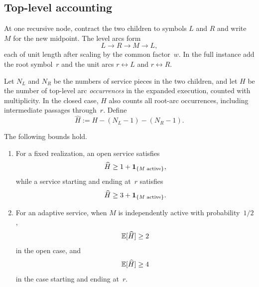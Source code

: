 \documentclass[12pt,a4paper,oneside]{report}
\begin{document}
\subsection{Top-level accounting}\label{sec:recursive-accounting}

At one recursive node, contract the two children to symbols $L$ and $R$ and
write $M$ for the new midpoint.  The level arcs form
\[
    L\longrightarrow R\longrightarrow M\longrightarrow L,
\]
each of unit length after scaling by the common factor~$w$.  In the full
instance add the root symbol~$r$ and the unit arcs
$r\leftrightarrow L$ and $r\leftrightarrow R$.

Let $N_L$ and $N_R$ be the numbers of service pieces in the two children, and
let $H$ be the number of top-level arc \emph{occurrences} in the expanded
execution, counted with multiplicity.  In the closed case, $H$ also counts all
root-arc occurrences, including intermediate passages through~$r$.  Define
\[
    \widehat H:=H-(N_L-1)-(N_R-1).
\]

\begin{lemma}\label{lem:top-accounting}
The following bounds hold.
\begin{enumerate}
    \item For a fixed realization, an open service satisfies
    \begin{equation}\label{eq:open-top-fixed}
        \widehat H\ge1+\mathbf{1}_{\{M\text{ active}\}},
    \end{equation}
    while a service starting and ending at~$r$ satisfies
    \begin{equation}\label{eq:closed-top-fixed}
        \widehat H\ge3+\mathbf{1}_{\{M\text{ active}\}}.
    \end{equation}
    \item For an adaptive service, when $M$ is independently active with
    probability~$1/2$,
    \begin{equation}\label{eq:open-top-adapt}
        \mathbb{E}[\widehat H]\ge2
    \end{equation}
    in the open case, and
    \begin{equation}\label{eq:closed-top-adapt}
        \mathbb{E}[\widehat H]\ge4
    \end{equation}
    in the case starting and ending at~$r$.
\end{enumerate}
\end{lemma}
\end{document}
